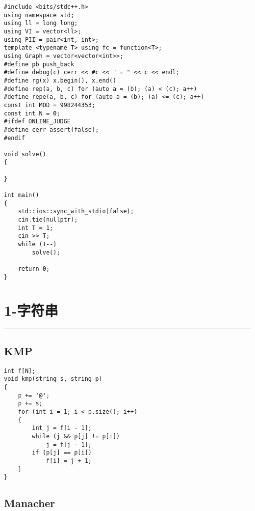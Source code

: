 \documentclass[]{article}
\begin{document}
\begin{verbatim}
#include <bits/stdc++.h>
using namespace std;
using ll = long long;
using VI = vector<ll>;
using PII = pair<int, int>;
template <typename T> using fc = function<T>;
using Graph = vector<vector<int>>;
#define pb push_back
#define debug(c) cerr << #c << " = " << c << endl;
#define rg(x) x.begin(), x.end()
#define rep(a, b, c) for (auto a = (b); (a) < (c); a++)
#define repe(a, b, c) for (auto a = (b); (a) <= (c); a++)
const int MOD = 998244353;
const int N = 0;
#ifdef ONLINE_JUDGE
#define cerr assert(false);
#endif

void solve()
{
    
}

int main()
{
    std::ios::sync_with_stdio(false);
    cin.tie(nullptr);
    int T = 1;
    cin >> T;
    while (T--)
        solve();

    return 0;
}
\end{verbatim}

\hypertarget{ux5b57ux7b26ux4e32}{%
\section{1-字符串}\label{ux5b57ux7b26ux4e32}}

\begin{center}\rule{0.5\linewidth}{0.5pt}\end{center}

\hypertarget{kmp}{%
\subsection{KMP}\label{kmp}}

\begin{verbatim}
int f[N];
void kmp(string s, string p)
{
    p += '@';
    p += s;
    for (int i = 1; i < p.size(); i++)
    {
        int j = f[i - 1];
        while (j && p[j] != p[i])
            j = f[j - 1];
        if (p[j] == p[i])
            f[i] = j + 1;
    }
}
\end{verbatim}

\hypertarget{manacher}{%
\subsection{Manacher}\label{manacher}}
\end{document}
